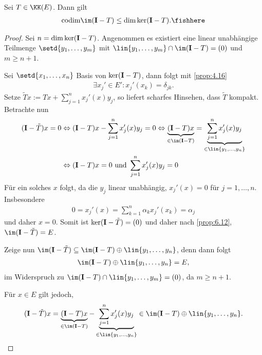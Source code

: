 \begin{prop}
\label{prop:6.29}
Sei $T\in\KK(E)$. Dann gilt
\begin{align*}
\codim\im(\Id -T) \le \dim\ker (\Id-T).\fishhere
\end{align*}
\end{prop}
\begin{proof}
Sei $n=\dim\ker(\mathbf{I}-T)$. Angenommen es existiert eine linear unabhängige
Teilmenge $\setd{y_1,\ldots,y_m}$ mit
$\lin{y_1,\ldots,y_m}\cap \im(\Id-T) = (0)$ und
 $m\ge n+1$.
 
 Sei $\setd{x_1,\ldots,x_n}$ Basis von $\ker(\mathbf{I}-T)$, dann folgt mit
 \ref{prop:4.16}
 \begin{align*}
 \exists x_j'\in E' : x_j'(x_k) = \delta_{jk}.
 \end{align*}
Setze $\tilde{T}x := Tx + \sum_{j=1}^n x_j'(x)y_j$, so liefert scharfes
Hinsehen, dass $\tilde{T}$ kompakt. Betrachte nun
\begin{align*}
(\Id-\tilde{T})x = 0 
&\Leftrightarrow (\Id-T)x - \sum_{j=1}^n x_j'(x)y_j = 0
\Leftrightarrow \underbrace{(\Id-T)x}_{\in \im (\Id-T)} =
\underbrace{\sum_{j=1}^n x_j'(x)y_j}_{\in \lin{y_1,\ldots,y_n}}\\
&\Leftrightarrow (\Id-T)x = 0 \text{ und } \sum_{j=1}^n x_j'(x)y_j = 0
\end{align*}
Für ein solches $x$ folgt, da die $y_j$ linear unabhängig, $x_j'(x)=0$
für $j=1,\ldots,n$. Insbesondere
\begin{align*}
0 = x_j'(x) = \sum_{k=1}^n \alpha_k x_j'(x_k) = \alpha_j
\end{align*}
und daher $x=0$. Somit ist $\ker(\mathbf{I}-\tilde{T}) = (0)$ und daher nach
\ref{prop:6.12}, $\im(\Id-\tilde{T}) = E$.

Zeige nun $\im(\Id-\tilde{T}) \subseteq \im (\Id-T)\oplus\lin{y_1,\ldots,y_n}$,
denn dann folgt
\begin{align*}
\im(\Id-T)\oplus \lin{y_1,\ldots,y_n} = E,
\end{align*}
im Widerspruch zu $\im(\Id-T)\cap \lin{y_1,\ldots,y_m} = (0)$, da $m\ge n+1$.

Für $x\in E$ gilt jedoch,
\begin{align*}
(\Id-\tilde{T})x = \underbrace{(\Id-T)x}_{\in\im (\Id-T)} - 
\underbrace{\sum_{j=1}^n x_j'(x)y_j}_{\in \lin{y_1,\ldots,y_n}} 
\in  \im(\Id-T)\oplus \lin{y_1,\ldots,y_n}.\qedhere
\end{align*}
\end{proof}

